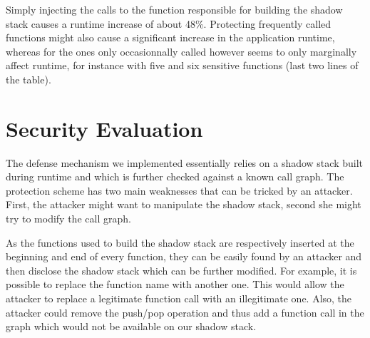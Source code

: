 \documentclass{llncs}
\begin{document}
Simply injecting the calls to the function responsible for building the shadow stack causes a runtime increase of about 48\%.
Protecting frequently called functions might also cause a significant increase in the application runtime, whereas for the ones only occasionnally called however seems to only marginally affect runtime, for instance with five and six sensitive functions (last two lines of the table).

\begin{table}
  \centering {}
  \caption{Runtime overhead with an increasing number of sensitive functions}
  \label{table:runtimeOverhead}
\end{table}


\section{Security Evaluation}
The defense mechanism we implemented essentially relies on a shadow stack built during runtime and which is further checked against a known call graph. The protection scheme has two main weaknesses that can be tricked by an attacker. First, the attacker might want to manipulate the shadow stack, second she might try to modify the call graph.

As the functions used to build the shadow stack are respectively inserted at the beginning and end of every function, they can be easily found by an attacker and then disclose the shadow stack which can be further modified. For example, it is possible to replace the function name with another one. This would allow the attacker to replace a legitimate function call with an illegitimate one. Also, the attacker could remove the push/pop operation and thus add a function call in the graph which would not be available on our shadow stack.
\end{document}
